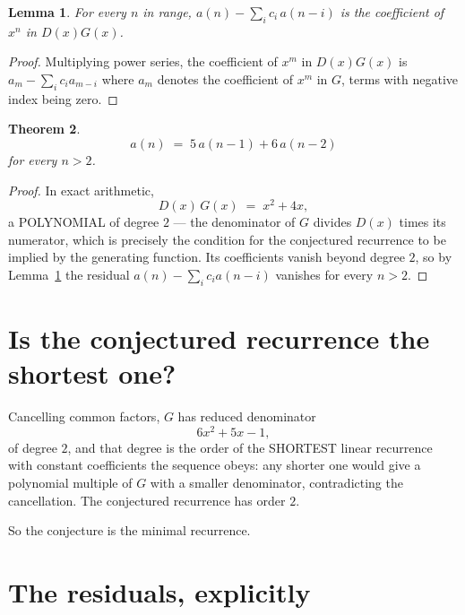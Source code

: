 \documentclass[11pt,a4paper]{article}
\theoremstyle{plain}
\newtheorem{theorem}{Theorem}
\newtheorem{lemma}[theorem]{Lemma}
\theoremstyle{definition}
\begin{document}
\begin{lemma}\label{lem:key}
For every $n$ in range, $a(n)-\sum_i c_i\,a(n-i)$ is the coefficient of $x^{n}$ in
$D(x)G(x)$.
\end{lemma}

\begin{proof}
Multiplying power series, the coefficient of $x^{m}$ in $D(x)G(x)$ is
$a_m-\sum_i c_i a_{m-i}$ where $a_m$ denotes the coefficient of $x^{m}$ in $G$, terms with
negative index being zero.
\end{proof}

\begin{theorem}
\[
a(n)\;=\;5\,a(n-1) + 6\,a(n-2)
\]
for every $n>2$.
\end{theorem}

\begin{proof}
In exact arithmetic,
\[
D(x)\,G(x)\;=\;x^{2} + 4 x,
\]
a POLYNOMIAL of degree $2$ --- the denominator of $G$ divides $D(x)$ times its numerator,
which is precisely the condition for the conjectured recurrence to be implied by the
generating function. Its coefficients vanish beyond degree $2$, so by
Lemma~\ref{lem:key} the residual $a(n)-\sum_ic_ia(n-i)$ vanishes for every
$n>2$.
\end{proof}

\section{Is the conjectured recurrence the shortest one?}

Cancelling common factors, $G$ has reduced denominator
\[
6 x^{2} + 5 x - 1,
\]
of degree $2$, and that degree is the order of the SHORTEST linear recurrence with
constant coefficients the sequence obeys: any shorter one would give a polynomial multiple of
$G$ with a smaller denominator, contradicting the cancellation. The conjectured recurrence has
order $2$.

So the conjecture is the minimal recurrence.

\section{The residuals, explicitly}
\end{document}
